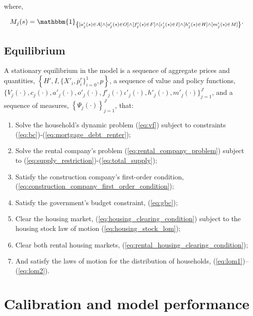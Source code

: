 \documentclass[parskip=full]{article}
\newcommand{\indicator}[1]{\mathbbm{1}_{\left\{ {#1} \right\} }}
\begin{document}
\noindent where,

\begin{align}
    M_{j}(s) = \indicator{[a'_{j}(s)\in A] \land [o'_{j}(s)\in O] \land [f'_{j}(s)\in F] \land [\iota'_{j}(s)\in I] \land [h'_{j}(s) \in H] \land [m'_{j}(s) \in M]}.\notag
\end{align}

\subsection{Equilibrium}
A stationary equilibrium in the model is a sequence of aggregate prices and quantities, $\left\{H',I,\{X'_{i},\overline{p}^{r}_{i}\}^{1}_{i=0},p\right\}$, a sequence of value and policy functions, $\biggl\{V_{j}(\cdot),c_{j}(\cdot),a'_{j}(\cdot),o'_{j}(\cdot),f'_{j}(\cdot)\iota'_{j}(\cdot),h'_{j}(\cdot),m'_{j}(\cdot)\biggl\}_{j=1}^J$, and a sequence of measures, $\left\{\Psi_{j}(\cdot)\right\}_{j=1}^J$, that:
\begin{enumerate}
\item Solve the household's dynamic problem (\ref{eq:vf}) subject to constraints (\ref{eq:bc})-(\ref{eq:mortgage_debt_renter});
\item Solve the rental company's problem (\ref{eq:rental_company_problem}) subject to (\ref{eq:supply_restriction})-(\ref{eq:total_supply});
\item Satisfy the construction company's first-order condition, (\ref{eq:construction_company_first_order_condition});
\item Satisfy the government's budget constraint, (\ref{eq:gbc});
\item Clear the housing market,
(\ref{eq:housing_clearing_condition}) subject to the housing stock law of motion (\ref{eq:housing_stock_lom});
\item Clear both rental housing markets,
(\ref{eq:rental_housing_clearing_condition});
\item And satisfy the laws of motion for the distribution of households, (\ref{eq:lom1})--(\ref{eq:lom2}).
\end{enumerate}

\section{Calibration and model performance}\label{sec:calibration}
\end{document}
